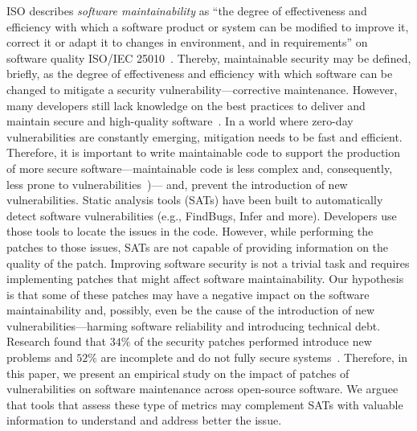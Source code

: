\documentclass[smallextended]{svjour3}       %
\begin{document}
ISO describes \textit{software maintainability} as ``the degree of 
effectiveness and efficiency with which a software product or system 
can be modified to improve it, correct it or adapt it to changes in 
environment, and in requirements'' on software quality ISO/IEC 
25010~\cite{iso:2011}. Thereby, maintainable security may be 
defined, briefly, as the degree of effectiveness and efficiency with 
which software can be changed to mitigate a security 
vulnerability---corrective maintenance.
However, many developers still lack knowledge on the best 
practices to deliver and maintain secure and high-quality 
software~\cite{Pothamsetty:2005:SEL:1107622.1107635,8077802}. In a 
world where zero-day vulnerabilities are constantly emerging, 
mitigation needs to be fast and efficient. Therefore, it 
is important to write maintainable code to support the production of 
more secure software---maintainable code is less complex and, 
consequently, less prone to
vulnerabilities~\cite{shin2010evaluating,10.1145/1774088.1774504})---
and, prevent the introduction of new vulnerabilities. 
%
Static analysis tools (SATs) have been built to automatically detect software 
vulnerabilities (e.g., FindBugs, Infer and more). Developers
use those tools to locate the issues in the code. However,
while performing the patches to those issues, SATs are not 
capable of providing information on the quality of the patch.
Improving software security is not a trivial task and 
requires implementing patches that might affect software 
maintainability. Our hypothesis is that some of these patches may 
have a negative impact on the software maintainability and, 
possibly, even be the cause of the introduction of new 
vulnerabilities---harming software reliability and introducing 
technical debt. Research found that $34\%$ of the security patches 
performed introduce new problems and $52\%$ are incomplete and do not 
fully secure systems~\cite{10.1145/3133956.3134072}. Therefore, in this paper, 
we present an empirical study on the impact of patches of 
vulnerabilities on software maintenance across open-source software.
We arguee that tools that assess these type of metrics may
complement SATs with valuable information to understand and
address better the issue.
\end{document}
